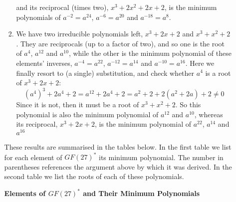 \documentclass[11pt]{article} \usepackage{amssymb}
\begin{document}
\begin{enumerate}
\begin{enumerate}
\begin{enumerate}
      and its reciprocal (times two), $x^3+2x^2+2x+2$, is the minimum
      polynomials of $a^{-2}=a^{24}$, $a^{-6}=a^{20}$ and $a^{-18}=a^{8}$.
    \item
      We have two irreducible polynomials left, $x^3+2x+2$ and $x^3+x^2+2$. 
      They are reciprocals (up to a factor of two), and so one is the
      root of $a^4$, $a^{12}$ and $a^{10}$, while the other is the minimum
      polynomial
      of these elements' inverses, $a^{-4}=a^{22}$, $a^{-12}=a^{14}$ and
      $a^{-10}=a^{16}$. Here we finally resort to (a single) substitution, and
      check whether $a^4$ is a root of $x^3+2x+2$:
      $$\left(a^4\right)^3+2a^4+2=a^{12}+2a^4+2=a^2+2+2(a^2+2a)+2 \neq 0$$
      Since it is not, then it must be a root of $x^3+x^2+2$. So this polynomial
      is also the minimum polynomial of $a^{12}$ and $a^{10}$, whereas
      its reciprocal, $x^3+2x+2$, is the minimum polynomial of $a^{22}$,
      $a^{14}$ and $a^{16}$
    \end{enumerate}
    These results are summarised in the tables below. In the first table 
    we list for each element of $GF(27)^*$ its minimum polynomial. 
    The number in parentheses references the argument above by which it was 
    derived. In the second table we list the roots of each of these
    polynomials.

    {\bf Elements of $GF(27)^*$ and Their Minimum Polynomials}

    \begin{tabular}{l| l r}


\end{tabular}
\end{enumerate}
\end{enumerate}
\end{document}
